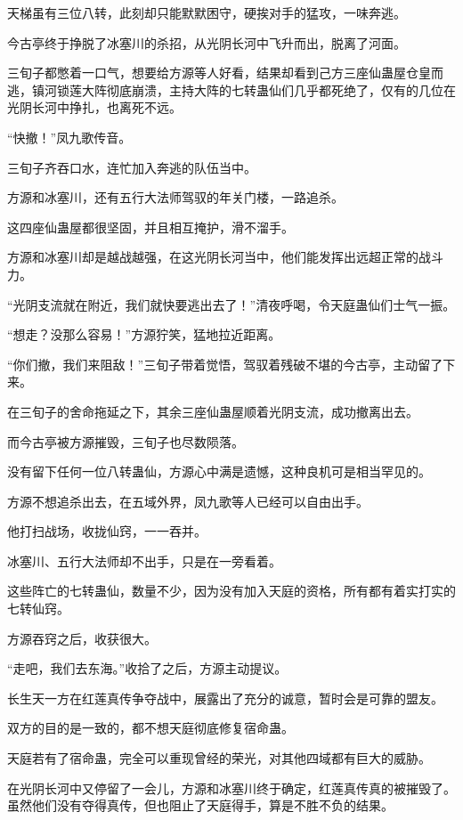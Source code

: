 \begin{this_body}
天梯虽有三位八转，此刻却只能默默困守，硬挨对手的猛攻，一味奔逃。

今古亭终于挣脱了冰塞川的杀招，从光阴长河中飞升而出，脱离了河面。

三旬子都憋着一口气，想要给方源等人好看，结果却看到己方三座仙蛊屋仓皇而逃，镇河锁莲大阵彻底崩溃，主持大阵的七转蛊仙们几乎都死绝了，仅有的几位在光阴长河中挣扎，也离死不远。

“快撤！”凤九歌传音。

三旬子齐吞口水，连忙加入奔逃的队伍当中。

方源和冰塞川，还有五行大法师驾驭的年关门楼，一路追杀。

这四座仙蛊屋都很坚固，并且相互掩护，滑不溜手。

方源和冰塞川却是越战越强，在这光阴长河当中，他们能发挥出远超正常的战斗力。

“光阴支流就在附近，我们就快要逃出去了！”清夜呼喝，令天庭蛊仙们士气一振。

“想走？没那么容易！”方源狞笑，猛地拉近距离。

“你们撤，我们来阻敌！”三旬子带着觉悟，驾驭着残破不堪的今古亭，主动留了下来。

在三旬子的舍命拖延之下，其余三座仙蛊屋顺着光阴支流，成功撤离出去。

而今古亭被方源摧毁，三旬子也尽数陨落。

没有留下任何一位八转蛊仙，方源心中满是遗憾，这种良机可是相当罕见的。

方源不想追杀出去，在五域外界，凤九歌等人已经可以自由出手。

他打扫战场，收拢仙窍，一一吞并。

冰塞川、五行大法师却不出手，只是在一旁看着。

这些阵亡的七转蛊仙，数量不少，因为没有加入天庭的资格，所有都有着实打实的七转仙窍。

方源吞窍之后，收获很大。

“走吧，我们去东海。”收拾了之后，方源主动提议。

长生天一方在红莲真传争夺战中，展露出了充分的诚意，暂时会是可靠的盟友。

双方的目的是一致的，都不想天庭彻底修复宿命蛊。

天庭若有了宿命蛊，完全可以重现曾经的荣光，对其他四域都有巨大的威胁。

在光阴长河中又停留了一会儿，方源和冰塞川终于确定，红莲真传真的被摧毁了。虽然他们没有夺得真传，但也阻止了天庭得手，算是不胜不负的结果。


\end{this_body}
